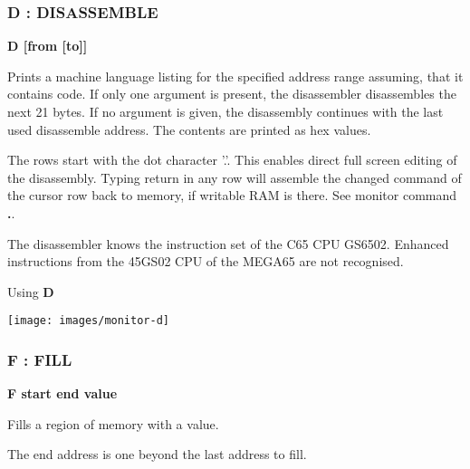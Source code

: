 
\subsubsection{D : DISASSEMBLE}
\begin{description}[leftmargin=2cm,style=nextline]
\item [Format:] {\bf D [from [to]]}
\item [Usage:] Prints a machine language listing for the specified
               address range assuming, that it contains code.
               If only one argument is present, the disassembler
               disassembles the next 21 bytes. If no argument is
               given, the disassembly continues with the last used
               disassemble address.
               The contents are printed as hex values.

\item [Remarks:] The rows start with the dot character '.'.
                 This enables direct full screen editing of the disassembly.
                 Typing return in any row will assemble the changed
                 command of the cursor row back to memory, if writable RAM is there.
                 See monitor command {\bf .}.

                 The disassembler knows the instruction set of the C65 CPU
                 GS6502. Enhanced instructions from the 45GS02 CPU of the MEGA65
                 are not recognised.

\item [Example:] Using {\bf D}
\end{description}
\texttt{[image: images/monitor-d]}


\subsubsection{F : FILL}
\begin{description}[leftmargin=2cm,style=nextline]
\item [Format:] {\bf F start end value}
\item [Usage:] Fills a region of memory with a value.

\item [Remarks:] The end address is one beyond the last address to fill.
\end{description}

